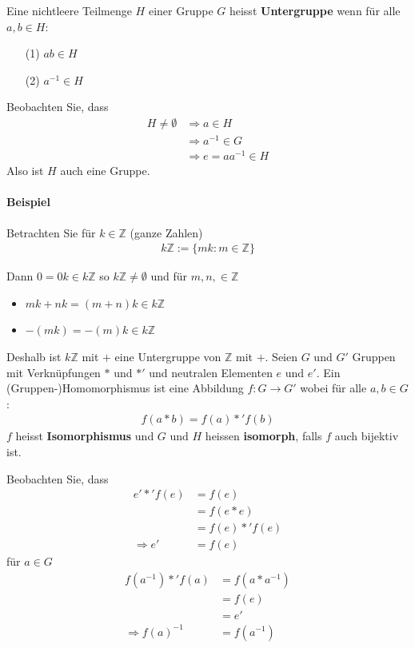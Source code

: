 \documentclass[11pt]{report}
\newcommand*\Zb[1] {\mathbb{#1}}
\newcommand*\f[1] {\textbf{#1}}
\begin{document}
Eine nichtleere Teilmenge $H$ einer Gruppe $G$ heisst \f{Untergruppe} wenn für alle $a, b \in H$:
\begin{itemize}
 \item[(1)] $ab \in H$
 \item[(2)] $a^{-1} \in H$
\end{itemize}
Beobachten Sie, dass 
\begin{align}
 H \neq \emptyset &\Rightarrow a \in H \\
                  &\Rightarrow a^{-1} \in G \\
                  &\Rightarrow e = aa^{-1} \in H
\end{align}
Also ist $H$ auch eine Gruppe.

\paragraph{Beispiel} Betrachten Sie für $k \in \Zb{Z}$ (ganze Zahlen)
\begin{align}
 k\Zb{Z} := \{mk : m\in \Zb{Z}\}
\end{align}

Dann $0=0k \in k\Zb{Z}$ so $k \Zb{Z} \neq \emptyset $ und für $m, n, \in \Zb{Z}$
\begin{itemize}
 \item $mk + nk = (m + n)k \in k\Zb{Z}$
 \item $-(mk) = -(m)k \in k\Zb{Z}$
\end{itemize}
Deshalb ist $k\Zb{Z}$ mit $+$ eine Untergruppe von $\Zb{Z}$ mit $+$.
Seien $G$ und $G'$ Gruppen mit Verknüpfungen $*$ und  $*'$ und neutralen Elementen $e$ und $e'$.
Ein (Gruppen-)Homomorphismus ist eine Abbildung $f: G \rightarrow G'$ wobei für alle $a, b \in G$:
\begin{align}
 f(a*b) = f(a) *' f(b)
\end{align}
$f$ heisst \f{Isomorphismus} und $G$ und $H$ heissen \f{isomorph}, falls $f$ auch bijektiv ist. 

Beobachten Sie, dass
\begin{align}
    e' *' f(e) &= f(e) \\
               &= f(e * e) \\
               &= f(e) *' f(e) \\
\Rightarrow e' &= f(e)
\end{align}
für $a \in G$
\begin{align}
 f(a^{-1}) *' f(a) &= f(a * a^{-1}) \\
                   &= f(e) \\
                   &= e' \\
\Rightarrow f(a)^{-1} &= f(a^{-1})
\end{align}
\end{document}
